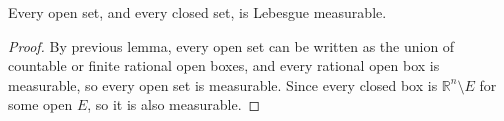 \begin{lemma}
    Every open set, and every closed set, is Lebesgue measurable.
\end{lemma}

\begin{proof}
    By previous lemma, every open set can be written as the union of countable or finite rational open boxes, and every rational open box is measurable, so every open set is measurable. Since every closed box is \(\mathbb{R} ^n \setminus E\) for some open \(E\), so it is also measurable.  
\end{proof}